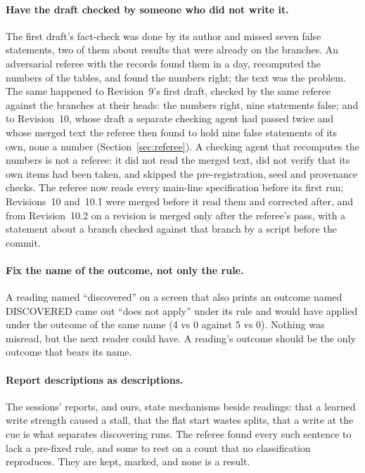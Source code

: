 \documentclass[11pt]{article}
\begin{document}
\paragraph{Have the draft checked by someone who did not write it.} The first draft's fact-check was done by its author and missed seven false statements, two of them about results that were already on the branches. An adversarial referee with the records found them in a day, recomputed the numbers of the tables, and found the numbers right; the text was the problem. The same happened to Revision~9's first draft, checked by the same referee against the branches at their heads: the numbers right, nine statements false; and to Revision~10, whose draft a separate checking agent had passed twice and whose merged text the referee then found to hold nine false statements of its own, none a number (Section~\ref{sec:referee}). A checking agent that recomputes the numbers is not a referee: it did not read the merged text, did not verify that its own items had been taken, and skipped the pre-registration, seed and provenance checks. The referee now reads every main-line specification before its first run; Revisions~10 and~10.1 were merged before it read them and corrected after, and from Revision~10.2 on a revision is merged only after the referee's pass, with a statement about a branch checked against that branch by a script before the commit.

\paragraph{Fix the name of the outcome, not only the rule.} A reading named ``discovered'' on a screen that also prints an outcome named DISCOVERED came out ``does not apply'' under its rule and would have applied under the outcome of the same name (4 vs 0 against 5 vs 0). Nothing was misread, but the next reader could have. A reading's outcome should be the only outcome that bears its name.

\paragraph{Report descriptions as descriptions.} The sessions' reports, and ours, state mechanisms beside readings: that a learned write strength caused a stall, that the flat start wastes splits, that a write at the cue is what separates discovering runs. The referee found every such sentence to lack a pre-fixed rule, and some to rest on a count that no classification reproduces. They are kept, marked, and none is a result.
\end{document}
